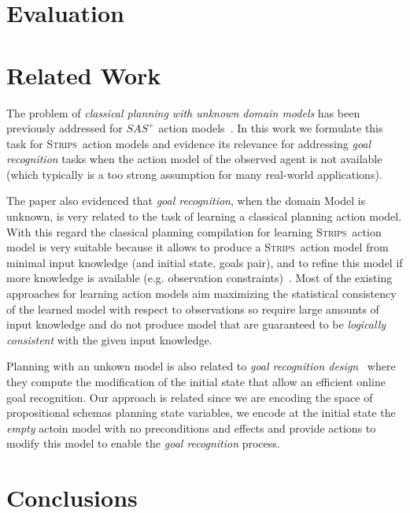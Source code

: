 \documentclass{article}
\newcommand{\strips}{\textsc{Strips}}
\begin{document}
\section{Evaluation}
\label{sec:evaluation}

\section{Related Work}
\label{sec:evaluation}
The problem of {\em classical planning with unknown domain models} has been previously addressed for $SAS^+$ action models~\cite{SternJ17}. In this work we formulate this task for \strips\ action models and evidence its relevance for addressing {\em goal recognition} tasks when the action model of the observed agent is not available (which typically is a too strong  assumption for many real-world applications).   

The paper also evidenced that {\em goal recognition}, when the domain Model is unknown, is very related to the task of learning a classical planning action model. With this regard the classical planning compilation for learning \strips\ action model is very suitable because it allows to produce a \strips\ action model from minimal input knowledge (and initial state, goals pair), and to refine this model if more knowledge is available (e.g. observation constraints)~\cite{aineto2018learning}. Most of the existing approaches for learning action models aim maximizing the statistical consistency of the learned model with respect to observations so require large amounts of input knowledge and do not produce model that are guaranteed to be {\em logically consistent} with the given input knowledge.

Planning with an unkown model is also related to {\em goal recognition design}~\cite{KerenGK14} where they compute the modification of the initial state that allow an efficient online goal recognition. Our approach is related since we are encoding the space of propositional schemas planning state variables, we encode at the initial state the {\em empty} actoin model with no preconditions and effects and provide actions to modify this model to enable the {\em goal recognition} process.


\section{Conclusions}
\label{sec:conclusions}




\end{document}
